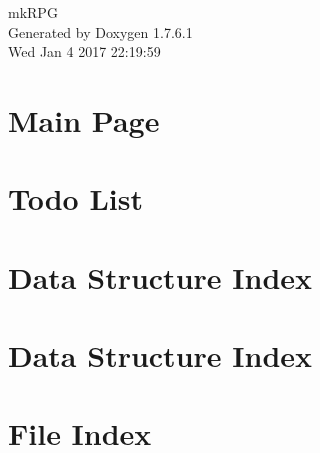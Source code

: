 \documentclass[a4paper]{book}
\begin{document}
\hypersetup{pageanchor=false,citecolor=blue}
\begin{titlepage}
\vspace*{7cm}
\begin{center}
{\Large mk\-R\-P\-G }\\
\vspace*{1cm}
{\large \-Generated by Doxygen 1.7.6.1}\\
\vspace*{0.5cm}
{\small Wed Jan 4 2017 22:19:59}\\
\end{center}
\end{titlepage}
\clearemptydoublepage
{}
\tableofcontents
\clearemptydoublepage
{}
\hypersetup{pageanchor=true,citecolor=blue}
\chapter{\-Main \-Page}
\label{index}\hypertarget{index}{}
\chapter{\-Todo \-List}
\label{todo}
\hypertarget{todo}{}

\chapter{\-Data \-Structure \-Index}

\chapter{\-Data \-Structure \-Index}

\chapter{\-File \-Index}

\end{document}
